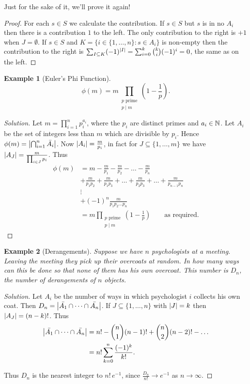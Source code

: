 \documentclass{notes}
\theoremstyle{plain}
\newtheorem*{example}{Example}
\begin{document}
Just for the sake of it, we'll prove it again!

\begin{proof}
For each $s \in S$ we calculate the contribution.  If $s \in S$ but
$s$ is in no $A_i$ then there is a contribution $1$ to the left.  The
only contribution to the right is $+1$ when $J = \emptyset$.  If
$s \in S$ and $K = \{ i \in \{1, \dots, n \} : s \in A_i \}$ is non-empty
then the contribution to the right is $\sum_{I \subseteq K}
(-1)^{\left|I\right|} = \sum_{i=0}^k \binom{k}{i} (-1)^i = 0$, the same as
on the left.
\end{proof}

\begin{example}[Euler's Phi Function]
\[
\phi(m) = m \prod_{\substack{p \text{ prime} \\ p \mid m}} \left(1-\frac{1}{p}
\right).
\]
\end{example}

\begin{proof}[Solution]
Let $m = \prod_{i=1}^n p_i^{a_i}$, where the $p_i$ are distinct primes
and $a_i \in \mathbb{N}$.  Let $A_i$ be the set of integers less than $m$ which
are divisible by $p_i$.  Hence $\phi(m) = \left|\bigcap_{i=1}^n \Bar{A_i}\right|$.
Now $\left|A_i\right| = \frac{m}{p_i}$, in fact for $J \subseteq \{ 1, \dots, m \}$
we have $\left|A_J\right| = \frac{m}{\prod_{i \in J} p_i}$.  Thus
\begin{align*}
\phi(m) & = m - \frac{m}{p_1} - \frac{m}{p_2} - \dots -
\frac{m}{p_n} \\
&+ \frac{m}{p_1 p_2} + \frac{m}{p_1 p_3} + \dots + \frac{m}{p_2 p_3}
+ \dots + \frac{m}{p_{n-1} p_n} \\
&\vdots \\
&+ (-1)^n \frac{m}{p_1 p_2 \dots p_n} \\
& = m \prod_{\substack{p \text{ prime} \\ p \mid m}} \left(1-\frac{1}{p}
\right) \qquad \text{as required.}
\end{align*}
\end{proof}

\begin{example}[Derangements]
Suppose we have $n$ psychologists at a meeting.
Leaving the meeting they pick up their overcoats at random.  In how many
ways can this be done so that none of them has his own overcoat.  This
number is $D_n$, the number of derangements of $n$ objects.
\end{example}

\begin{proof}[Solution]
Let $A_i$ be the number of ways in which psychologist $i$ collects his own
coat.  Then $D_n = \left|\Bar{A_1} \cap \dots \cap \Bar{A_n}\right|$.
If $J \subseteq \{1, \dots, n \}$ with $\left|J\right| = k$ then
$\left|A_J\right| = (n-k)!$.  Thus
\begin{align*}
\left|\Bar{A_1} \cap \dots \cap \Bar{A_n}\right| &= n! - \binom{n}{1} (n-1)!
+ \binom{n}{2} (n-2)! - \dots \\
&= n! \sum_{k=0}^n \frac{(-1)^k}{k!}.
\end{align*}

Thus $D_n$ is the nearest integer to $n!\, e^{-1}$, since $\frac{D_n}{n!}
\to e^{-1}$ as $n \to \infty$.
\end{proof}
\end{document}
